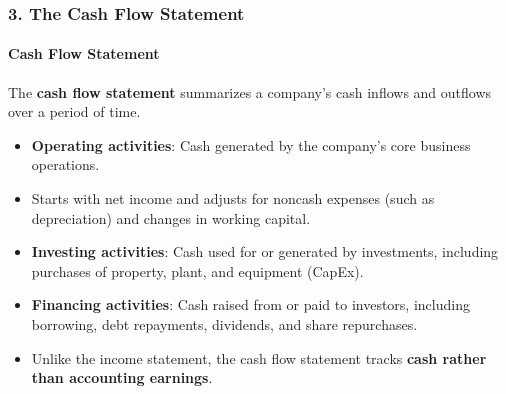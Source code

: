\documentclass{beamer}
\begin{document}
\begin{frame}[t]
    \frametitle{3. The Cash Flow Statement}
    \framesubtitle{Cash Flow Statement}

    The \textbf{cash flow statement} summarizes a company's
    cash inflows and outflows over a period of time.

    \vspace{1em}

    \begin{itemize}
        \item \textbf{Operating activities}: Cash generated by
        the company's core business operations.

        \item Starts with net income and adjusts for noncash
        expenses (such as depreciation) and changes in
        working capital.

        \item \textbf{Investing activities}: Cash used for or
        generated by investments, including purchases of
        property, plant, and equipment (CapEx).

        \item \textbf{Financing activities}: Cash raised from or
        paid to investors, including borrowing, debt repayments,
        dividends, and share repurchases.

        \item Unlike the income statement, the cash flow statement
        tracks \textbf{cash rather than accounting earnings}.
    \end{itemize}

\end{frame}
\end{document}
